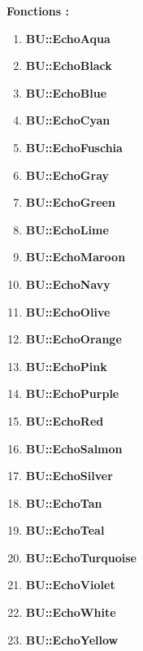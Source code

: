 \documentclass[a4paper,10pt]{article}
\begin{document}
\begin{justify}
    \textbf{Fonctions :}
    \begin{enumerate}
        \item \textbf{\color{Aqua}BU::EchoAqua}\setlength{\parskip}{0em}
        \item \textbf{\color{text}BU::EchoBlack}
        \item \textbf{\color{Blue}BU::EchoBlue}

        \setlength{\parskip}{1em}

        \item \textbf{\color{Cyan}BU::EchoCyan}\setlength{\parskip}{0em}
        \item \textbf{\color{Fuchsia}BU::EchoFuschia}
        \item \textbf{\color{Gray}BU::EchoGray}

        \setlength{\parskip}{1em}

        \item \textbf{\color{Green}BU::EchoGreen}\setlength{\parskip}{0em}
        \item \textbf{\color{Lime}BU::EchoLime}
        \item \textbf{\color{Maroon}BU::EchoMaroon}

        \setlength{\parskip}{1em}

        \item \textbf{\color{Navy}BU::EchoNavy}\setlength{\parskip}{0em}
        \item \textbf{\color{Olive}BU::EchoOlive}
        \item \textbf{\color{Orange}BU::EchoOrange}

        \setlength{\parskip}{1em}

        \item \textbf{\color{Pink}BU::EchoPink}\setlength{\parskip}{0em}
        \item \textbf{\color{Purple}BU::EchoPurple}
        \item \textbf{\color{Red}BU::EchoRed}

        \setlength{\parskip}{1em}

        \item \textbf{\color{Salmon}BU::EchoSalmon}\setlength{\parskip}{0em}
        \item \textbf{\color{Silver}BU::EchoSilver}
        \item \textbf{\color{Tan}BU::EchoTan}

        \setlength{\parskip}{1em}

        \item \textbf{\color{Teal}BU::EchoTeal}\setlength{\parskip}{0em}
        \item \textbf{\color{Turquoise}BU::EchoTurquoise}
        \item \textbf{\color{Violet}BU::EchoViolet}

        \setlength{\parskip}{1em}

        \item \textbf{\color{text}BU::EchoWhite}\setlength{\parskip}{0em}
        \item \textbf{\color{Yellow}BU::EchoYellow}
    \end{enumerate}
\end{justify}
\end{document}
